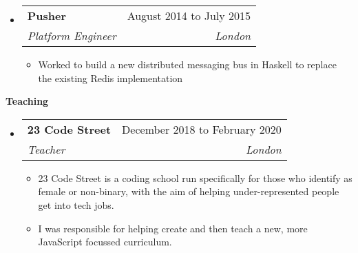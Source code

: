 \documentclass[letterpaper,12pt]{article}[leftmargin=*]
\makeatletter
\def \entryspacing {-0pt}
\renewcommand{\section}[2]{\vspace{5pt}
  \colorbox{secondary}{\color{white}\raggedbottom\normalsize{#1}{\hspace{7pt}\textbf{#2}}}
}
\newenvironment{resumeEntry}[0]{
  \begin{itemize}[leftmargin=2.5mm]
  }{
  \end{itemize}\vspace{\entryspacing}
}
\newenvironment{resumeItemList}[0]{
  \begin{itemize}[leftmargin=4.5mm]
  }{
  \end{itemize}
}
\newcommand{\resumeItem}[1]{
  \item\small{
    {#1 \vspace{-2pt}}
  }
}
\newcommand{\resumeEntryTSDL}[4]{
  \vspace{-1pt}\item[]
    \begin{tabularx}{0.97\textwidth}{X@{\hspace{60pt}}r}
      \textbf{\color{primary}#1} & {\firabook\color{accent}\small#2} \\
      \textit{\color{accent}\small#3} & \textit{\color{accent}\small#4} \\
    \end{tabularx}\vspace{-6pt}
}
\makeatother
\begin{document}
  \begin{resumeEntry}
    \resumeEntryTSDL{Pusher}{August 2014 to July 2015}
      {Platform Engineer}{London}
    \begin{resumeItemList}
      \resumeItem{Worked to build a new distributed messaging bus in Haskell to replace the existing Redis implementation}
    \end{resumeItemList}
  \end{resumeEntry}



\section{\faGraduationCap}{Teaching}

  \begin{resumeEntry}
    \resumeEntryTSDL{23 Code Street}{December 2018 to February 2020}{Teacher}{London}
    \begin{resumeItemList}
      \resumeItem{23 Code Street is a coding school run specifically for those who identify as female or non-binary, with the aim of helping under-represented people get into tech jobs.}
      \resumeItem{I was responsible for helping create and then teach a new, more JavaScript focussed curriculum.}
    \end{resumeItemList}
  \end{resumeEntry}
\end{document}
